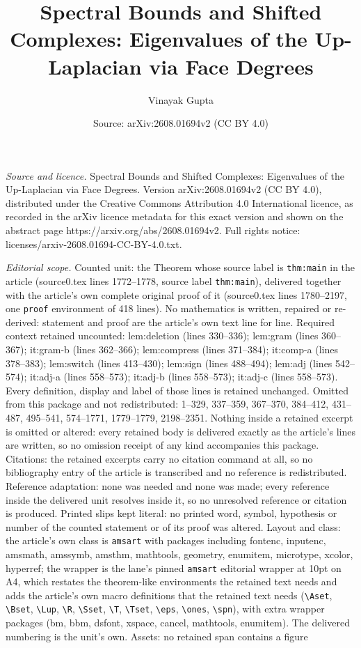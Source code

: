 \documentclass[10pt,a4paper]{amsart}
\title[Spectral Bounds and Shifted Complexes: Eigenvalues of the Up]{Spectral Bounds and Shifted Complexes: Eigenvalues of the Up-Laplacian via Face Degrees}
\author{Vinayak Gupta}
\date{Source: arXiv:2608.01694v2 (CC BY 4.0)}
\begin{document}
\maketitle

\noindent\emph{Source and licence.} Spectral Bounds and Shifted Complexes: Eigenvalues of the Up-Laplacian via Face Degrees. Version arXiv:2608.01694v2 (CC BY 4.0), distributed under the Creative Commons Attribution 4.0 International licence, as recorded in the arXiv licence metadata for this exact version and shown on the abstract page https://arxiv.org/abs/2608.01694v2. Full rights notice: licenses/arxiv-2608.01694-CC-BY-4.0.txt.\par\smallskip

\noindent\textit{Editorial scope.} Counted unit: the Theorem whose source label is \texttt{thm:main} in the article (source0.tex lines 1772--1778, source label \texttt{thm:main}), delivered together with the article's own complete original proof of it (source0.tex lines 1780--2197, one \texttt{proof} environment of 418 lines). No mathematics is written, repaired or re-derived: statement and proof are the article's own text line for line. Required context retained uncounted: lem:deletion (lines 330--336); lem:gram (lines 360--367); it:gram-b (lines 362--366); lem:compress (lines 371--384); it:comp-a (lines 378--383); lem:switch (lines 413--430); lem:sign (lines 488--494); lem:adj (lines 542--574); it:adj-a (lines 558--573); it:adj-b (lines 558--573); it:adj-c (lines 558--573). Every definition, display and label of those lines is retained unchanged. Omitted from this package and not redistributed: 1--329, 337--359, 367--370, 384--412, 431--487, 495--541, 574--1771, 1779--1779, 2198--2351. Nothing inside a retained excerpt is omitted or altered: every retained body is delivered exactly as the article's lines are written, so no omission receipt of any kind accompanies this package. Citations: the retained excerpts carry no citation command at all, so no bibliography entry of the article is transcribed and no reference is redistributed. Reference adaptation: none was needed and none was made; every reference inside the delivered unit resolves inside it, so no unresolved reference or citation is produced. Printed slips kept literal: no printed word, symbol, hypothesis or number of the counted statement or of its proof was altered. Layout and class: the article's own class is \texttt{amsart} with packages including fontenc, inputenc, amsmath, amssymb, amsthm, mathtools, geometry, enumitem, microtype, xcolor, hyperref; the wrapper is the lane's pinned \texttt{amsart} editorial wrapper at 10pt on A4, which restates the theorem-like environments the retained text needs and adds the article's own macro definitions that the retained text needs (\texttt{\textbackslash Aset}, \texttt{\textbackslash Bset}, \texttt{\textbackslash Lup}, \texttt{\textbackslash R}, \texttt{\textbackslash Sset}, \texttt{\textbackslash T}, \texttt{\textbackslash Tset}, \texttt{\textbackslash eps}, \texttt{\textbackslash ones}, \texttt{\textbackslash spn}), with extra wrapper packages (bm, bbm, dsfont, xspace, cancel, mathtools, enumitem). The delivered numbering is the unit's own. Assets: no retained span contains a figure 
\end{document}
